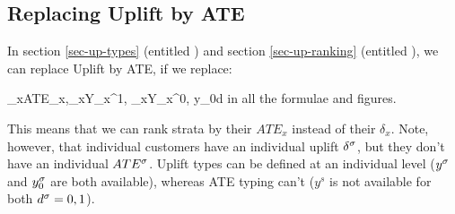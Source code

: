 \subsection{Replacing Uplift by ATE}
In section \ref{sec-up-types} (entitled )
and section \ref{sec-up-ranking} (entitled 
),
we can replace Uplift by ATE, if we replace:

\beq
\delta_x\rarrow ATE_x,\quad \av{\rvy}_x\rarrow Y_x^1,\quad
{}_x\rarrow Y_x^0, \quad y_0\rarrow d
\eeq
in all the formulae and figures.

This means that we can rank strata by their $ATE_x$ instead of
their $\delta_x$. Note, however, that individual customers
have an individual uplift $\delta^\sigma$, but they don't have an
individual $ATE^\sigma$.
Uplift types
can be defined at an individual level
($y^\sigma$ and
$y^\sigma_0$ are both available), whereas ATE typing can't
($y^s$ is not available for both $d^\sigma=0,1$).



